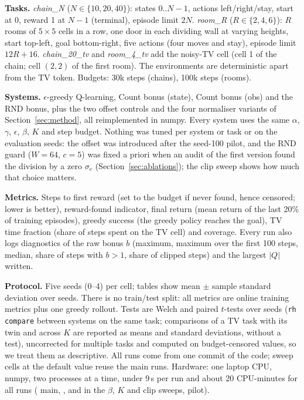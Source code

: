 \textbf{Tasks.} \emph{chain\_N} ($N\in\{10,20,40\}$): states $0..N-1$, actions left/right/stay, start at 0, reward 1 at $N-1$ (terminal), episode limit $2N$. \emph{room\_R} ($R\in\{2,4,6\}$): $R$ rooms of $5\times5$ cells in a row, one door in each dividing wall at varying heights, start top-left, goal bottom-right, five actions (four moves and stay), episode limit $12R+16$. \emph{chain\_20\_tv} and \emph{room\_4\_tv} add the noisy-TV cell (cell 1 of the chain; cell $(2,2)$ of the first room). The environments are deterministic apart from the TV token. Budgets: 30k steps (chains), 100k steps (rooms).

\textbf{Systems.} $\epsilon$-greedy Q-learning, Count bonus (state), Count bonus (obs) and the RND bonus, plus the two offset controls and the four normaliser variants of Section~\ref{sec:method}, all reimplemented in numpy. Every system uses the same $\alpha$, $\gamma$, $\epsilon$, $\beta$, $K$ and step budget. Nothing was tuned per system or task or on the evaluation seeds: the offset was introduced after the seed-100 pilot, and the RND guard ($W=64$, $c=5$) was fixed a priori when an audit of the first version found the division by a zero $\sigma_e$ (Section~\ref{sec:ablations}); the clip sweep shows how much that choice matters.

\textbf{Metrics.} Steps to first reward (set to the budget if never found, hence censored; lower is better), reward-found indicator, final return (mean return of the last 20\% of training episodes), greedy success (the greedy policy reaches the goal), TV time fraction (share of steps spent on the TV cell) and coverage. Every run also logs diagnostics of the raw bonus $b$ (maximum, maximum over the first 100 steps, median, share of steps with $b>1$, share of clipped steps) and the largest $|Q|$ written.

\textbf{Protocol.} Five seeds (0--4) per cell; tables show mean $\pm$ sample standard deviation over seeds. There is no train/test split: all metrics are online training metrics plus one greedy rollout. Tests are Welch and paired $t$-tests over seeds (\texttt{rh compare} between systems on the same task; comparisons of a TV task with its twin and across $K$ are reported as means and standard deviations, without a test), uncorrected for multiple tasks and computed on budget-censored values, so we treat them as descriptive. All runs come from one commit of the code; sweep cells at the default value reuse the main runs. Hardware: one laptop CPU, numpy, two processes at a time, under 9\,s per run and about 20 CPU-minutes for all runs ( main, ,  and  in the $\beta$, $K$ and clip sweeps,  pilot).

